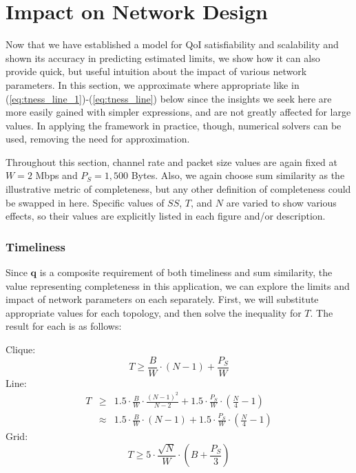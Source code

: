 \section{Impact on Network Design}
\label{sec:network_design}
 
Now that we have established a model for QoI satisfiability and scalability and shown its accuracy in predicting estimated limits, we show how it can also provide quick, but useful intuition about the impact of various network parameters.  In this section, we approximate where appropriate like in (\ref{eq:tness_line_1})-(\ref{eq:tness_line}) below since the insights we seek here are more easily gained with simpler expressions, and are not greatly affected for large values.  In applying the framework in practice, though, numerical solvers can be used, removing the need for approximation.    

Throughout this section, channel rate and packet size values are again fixed at $W = 2$ Mbps and $P_S = 1,500$ Bytes.  Also, we again choose sum similarity as the illustrative metric of completeness, but any other definition of completeness could be swapped in here.  Specific values of $SS$, $T$, and $N$ are varied to show various effects, so their values are explicitly listed in each figure and/or description.

\subsubsection{Timeliness}
Since $\mathbf{q}$ is a composite requirement of both timeliness and sum similarity, the value representing completeness in this application, we can explore the limits and impact of network parameters on each separately.  First, we will substitute appropriate values for each topology, and then solve the inequality for $T$. The result for each is as follows:

\vspace{4mm}
\noindent
Clique:
\begin{equation}
	T \geq \frac{B}{W} \cdot (N -1) + \frac{P_S}{W}
\label{eq:tness_clique}
\end{equation}
Line:
\begin{eqnarray}
\label{eq:tness_line_1}
	T &\geq& 1.5 \cdot \frac{B}{W} \cdot \frac{(N-1)^2}{N-2} + 1.5 \cdot \frac{P_S}{W} \cdot (\frac{N}{4} - 1) \\
	&\approx& 1.5 \cdot \frac{B}{W} \cdot (N-1) + 1.5 \cdot \frac{P_S}{W} \cdot (\frac{N}{4} - 1)
\label{eq:tness_line}
\end{eqnarray}
Grid:
\begin{equation}
	T \geq 5 \cdot \frac{\sqrt{N}}{W} \cdot (B + \frac{P_S}{3})
\label{eq:tness_grid}
\end{equation}

